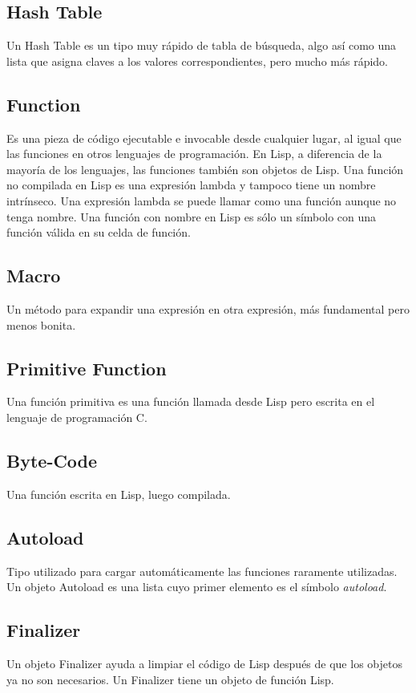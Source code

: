 \documentclass[10pt,journal,compsoc]{IEEEtran}
\begin{document}
\subsection{Hash Table}
Un Hash Table es un tipo muy r\'apido de tabla de b\'usqueda, algo as\'i como una lista que asigna claves a los valores correspondientes, pero mucho m\'as r\'apido.

\subsection{Function}
Es una pieza de c\'odigo ejecutable e invocable desde cualquier lugar, al igual que las funciones en otros lenguajes de programaci\'on. En Lisp, a diferencia de la mayor\'ia de los lenguajes, las funciones tambi\'en son objetos de Lisp. Una funci\'on no compilada en Lisp es una expresi\'on lambda y tampoco tiene un nombre intr\'inseco. Una expresi\'on lambda se puede llamar como una funci\'on aunque no tenga nombre. Una funci\'on con nombre en Lisp es s\'olo un s\'imbolo con una funci\'on v\'alida en su celda de funci\'on.

\subsection{Macro}
Un m\'etodo para expandir una expresi\'on en otra expresi\'on, m\'as fundamental pero menos bonita.

\subsection{Primitive Function}
Una funci\'on primitiva es una funci\'on llamada desde Lisp pero escrita en el lenguaje de programaci\'on C.

\subsection{Byte-Code}
Una funci\'on escrita en Lisp, luego compilada.

\subsection{Autoload}
Tipo utilizado para cargar autom\'aticamente las funciones raramente utilizadas. Un objeto Autoload es una lista cuyo primer elemento es el s\'imbolo \emph{autoload}.

\subsection{Finalizer}
Un objeto Finalizer ayuda a limpiar el c\'odigo de Lisp despu\'es de que los objetos ya no son necesarios. Un Finalizer tiene un objeto de funci\'on Lisp.
\end{document}
